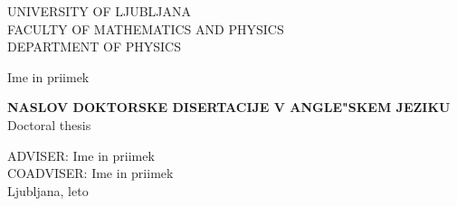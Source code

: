 
\pagestyle{empty}
\begin{center}

{\large UNIVERSITY OF LJUBLJANA\\
FACULTY OF MATHEMATICS AND PHYSICS\\
DEPARTMENT OF PHYSICS\\}

\vspace{4cm}

{\Large Ime in priimek\\}

\vspace{10mm}

{\bf \Large NASLOV DOKTORSKE DISERTACIJE V ANGLE"SKEM JEZIKU}\\
\vspace{5mm}
{\sc Doctoral thesis}\\

\vfill

{\large ADVISER: Ime in priimek\\
COADVISER: Ime in priimek\\

\vspace{2cm}
Ljubljana, leto}

\end{center}



